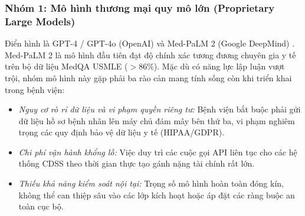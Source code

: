 \subsubsection{Nhóm 1: Mô hình thương mại quy mô lớn (Proprietary Large Models)}
Điển hình là GPT-4 / GPT-4o (OpenAI) \cite{achiam2023gpt4} và Med-PaLM 2 (Google DeepMind) \cite{singhal2023towards}. Med-PaLM 2 là mô hình đầu tiên đạt độ chính xác tương đương chuyên gia y tế trên bộ dữ liệu MedQA USMLE ($>86\%$). Mặc dù có năng lực lập luận vượt trội, nhóm mô hình này gặp phải ba rào cản mang tính sống còn khi triển khai trong bệnh viện:
\begin{itemize}
    \item \emph{Nguy cơ rò rỉ dữ liệu và vi phạm quyền riêng tư:} Bệnh viện bắt buộc phải gửi dữ liệu hồ sơ bệnh nhân lên máy chủ đám mây bên thứ ba, vi phạm nghiêm trọng các quy định bảo vệ dữ liệu y tế (HIPAA/GDPR).
    \item \emph{Chi phí vận hành khổng lồ:} Việc duy trì các cuộc gọi API liên tục cho các hệ thống CDSS theo thời gian thực tạo gánh nặng tài chính rất lớn.
    \item \emph{Thiếu khả năng kiểm soát nội tại:} Trọng số mô hình hoàn toàn đóng kín, không thể can thiệp sâu vào các lớp kích hoạt hoặc áp đặt các ràng buộc an toàn cục bộ.
\end{itemize}

